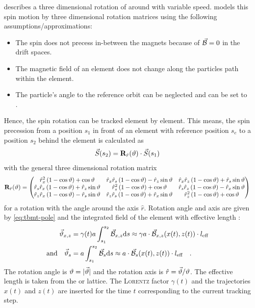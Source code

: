 \documentclass[a4paper]{scrartcl}
\begin{document}
 describes a three dimensional rotation of \svec around \bnvec with variable
speed. \polem models this spin motion by three dimensional rotation matrices using the
following assumptions/approximations:
\begin{itemize}
\item The spin does not precess in-between the magnets because of $\bnvec=0$ in the drift
  spaces.
\item The magnetic field of an element does not change along the particles path within the
  element.
\item The particle's angle to the reference orbit can be neglected and \bpara can be set
  to \blong.
\end{itemize}
Hence, the spin rotation can be tracked element by element. This means, the spin
precession from a position $s_1$ in front of an element with reference position $s_e$ to a
position $s_2$ behind the element is calculated as
\begin{equation}
  \label{eq:matrixtracking}
  \svec(s_2) = \mathbf{R}_{\hat{r}}(\sang) \cdot\svec(s_1)
\end{equation}
with the general three dimensional rotation matrix
\begin{equation*}
  \mathbf{R}_{\hat{r}}(\sang) = 
  \begin{pmatrix}
    \hat{r}_x^2\left(1-\cos \sang \right)+\cos \sang &\hat{r}_x\hat{r}_s\left(1-\cos \sang
    \right)-\hat{r}_z\sin \sang &\hat{r}_x\hat{r}_z\left(1-\cos \sang \right)+\hat{r}_s\sin
    \sang \\
    \hat{r}_s\hat{r}_x\left(1-\cos \sang \right)+\hat{r}_z\sin \sang &\hat{r}_s^2\left(1-\cos \sang
    \right)+\cos \sang &\hat{r}_s\hat{r}_z\left(1-\cos \sang \right)-\hat{r}_x\sin \sang \\
    \hat{r}_z\hat{r}_x\left(1-\cos \sang \right)-\hat{r}_s\sin \sang &\hat{r}_z\hat{r}_s\left(1-\cos \sang
    \right)+\hat{r}_x \sin \sang &\hat{r}_z^{2}\left(1-\cos \sang \right)+\cos \sang
  \end{pmatrix}
\end{equation*}
for a rotation with the angle \sang around the axis $\hat{r}$. Rotation angle and axis are
given by \cref{eq:tbmt-pole} and the integrated field of the element with effective length
\leff:
\begin{align*}
  \vec\sang_{x,z} &= \gamma(t)a \int_{s_1}^{s_2} \bnvec[x,z] \dif s \approx \ga\cdot \bnvec[x,z](x(t),z(t)) \cdot\leff\\
  \text{and}\quad \vec\sang_{s} &= a \int_{s_1}^{s_2} \bnvec[s] \dif s \approx a\cdot \bnvec[s](x(t),z(t)) \cdot\leff
  \quad.
\end{align*}
The rotation angle is $\sang = |\vec\sang|$ and the rotation axis
is $\hat{r} = \vec\sang / \sang$.
%
The effective length \leff is taken from the \ele or \madx lattice.
The \textsc{Lorentz} factor $\gamma(t)$ and the trajectories $x(t)$ and $z(t)$ are
inserted for the time $t$ corresponding to the current tracking step.
\end{document}
